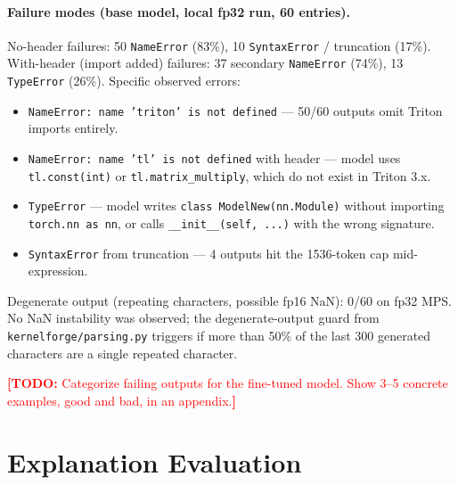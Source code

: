 \documentclass[11pt]{article}
\newcommand{\todo}[1]{\textcolor{red}{\textbf{[TODO:} #1\textbf{]}}}
\newcommand{\code}[1]{\texttt{#1}}
\begin{document}
\paragraph{Failure modes (base model, local fp32 run, 60 entries).}
No-header failures: 50 \code{NameError} (83\%), 10 \code{SyntaxError} / truncation (17\%).
With-header (import added) failures: 37 secondary \code{NameError} (74\%), 13 \code{TypeError} (26\%).
Specific observed errors:
\begin{itemize}
  \item \code{NameError: name 'triton' is not defined} — 50/60 outputs omit Triton imports entirely.
  \item \code{NameError: name 'tl' is not defined} with header — model uses \code{tl.const(int)} or
        \code{tl.matrix\_multiply}, which do not exist in Triton 3.x.
  \item \code{TypeError} — model writes \code{class ModelNew(nn.Module)} without importing
        \code{torch.nn as nn}, or calls \code{\_\_init\_\_(self, ...)} with the wrong signature.
  \item \code{SyntaxError} from truncation — 4 outputs hit the 1536-token cap mid-expression.
\end{itemize}
Degenerate output (repeating characters, possible fp16 NaN): 0/60 on fp32 MPS.
No NaN instability was observed; the degenerate-output guard from \code{kernelforge/parsing.py}
triggers if more than 50\% of the last 300 generated characters are a single repeated character.

\todo{Categorize failing outputs for the fine-tuned model. Show 3--5 concrete examples,
good and bad, in an appendix.}

\section{Explanation Evaluation}
\label{sec:explanations}
\end{document}
